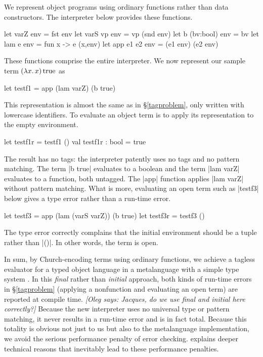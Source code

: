 \documentclass[preprint]{sigplanconf}
\newcommand{\oleg}[1]{{\it [Oleg says: #1]}}
\newcommand{\fun}[1]{\mathopen{\lambda\mathord{#1}.\,}}
\newcommand{\True}{\mathinner{\mathrm{true}}}
\begin{document}
We represent object programs using ordinary functions rather than
data constructors.  The interpreter below provides these functions.
\begin{code}
let varZ env        = fst env
let varS vp env     = vp (snd env)
let b (bv:bool) env = bv
let lam e env       = fun x -> e (x,env)
let app e1 e2 env   = (e1 env) (e2 env)
\end{code}
These functions comprise the entire interpreter.
We now represent our sample term $(\fun{x}x)\True$ as
\begin{code}
let testf1 = app (lam varZ) (b true)
\end{code}
This representation is almost the same as in \S\ref{tagproblem}, only
written with lowercase identifiers. To evaluate an object term is to
apply its representation to the empty environment.
\begin{code}
let testf1r = testf1 ()
val testf1r : bool = true
\end{code}
The result has no tags: the interpreter patently uses no tags and no
pattern matching. The term |b true| evaluates to a boolean and the term
|lam varZ| evaluates to a function, both untagged. The |app| function
applies |lam varZ| without pattern matching. What is more, evaluating an
open term such as |testf3| below gives a type error rather than
a run-time error.
\begin{code}
let testf3 = app (lam (varS varZ)) (b true)
let testf3r = testf3 ()
\end{code}
The type error correctly complains
that the initial environment should be a tuple rather than |()|.
In other words, the term is open.

In sum, by Church\hyp encoding terms using ordinary functions,
we achieve a tagless evaluator
for a typed object language in a metalanguage with a simple type
system \citep{hindley-principal,milner-theory}.  In this \emph{final}
rather than \emph{initial} approach, both kinds of run-time errors
in \S\ref{tagproblem} (applying a nonfunction and evaluating an open
term) are reported at compile time. 
\oleg{Jacques, do we use final and initial here correctly?}
Because the new interpreter uses no
universal type or
pattern matching, it never results in a run-time error and is in fact
total.  Because this totality is obvious not just to us but also to the
metalanguage implementation, we avoid the serious performance penalty
\citep{WalidICFP02} of error checking.  
explains deeper technical reasons that inevitably lead to these performance
penalties.
\end{document}
